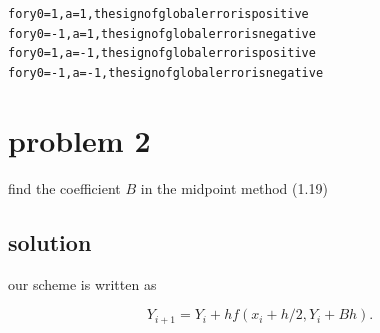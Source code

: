 \documentclass[letterpaper,10pt,english]{/Library/Python/2.7/site-packages/Sphinx-1.2-py2.7.egg/sphinx/texinputs/sphinxhowto}
\newenvironment{InvisibleVerbatim}
        {\begin{mdframed}[leftmargin=0.1\linewidth,innerleftmargin=3pt,innerrightmargin=3pt, userdefinedwidth=1\linewidth, linewidth=0pt, linecolor=white, usetwoside=false]}
        {\end{mdframed}}
\begin{document}
        

            
                \begin{InvisibleVerbatim}
                \vspace{-0.5\baselineskip}
\begin{alltt}for y0=1,a=1, the sign of global error is positive
for y0=-1,a=1, the sign of global error is negative
for y0=1,a=-1, the sign of global error is positive
for y0=-1,a=-1, the sign of global error is negative
\end{alltt}

            \end{InvisibleVerbatim}
            
        
    
\section{problem 2}find the coefficient $B$ in the midpoint method (1.19)\subsection{solution}our scheme is written as

\[ Y_{i+1} = Y_i + hf(x_i +h/2, Y_i + Bh) .\]
\end{document}
